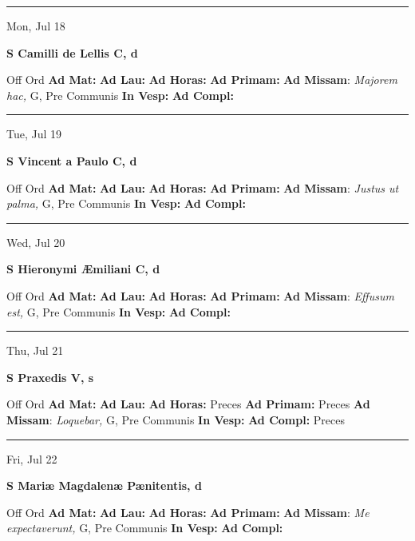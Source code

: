 \documentclass[letterpaper, 10pt]{article}
\begin{document}
\hrule
\begin{center}
Mon, Jul 18
\end{center}\textbf{ \large S Camilli de Lellis C, \textnormal{\normalsize d}}
\begin{justify}
Off Ord
\textbf{Ad Mat: }
\textbf{Ad Lau: }
\textbf{Ad Horas: }
\textbf{Ad Primam: }
\textbf{Ad Missam}: \textit{Majorem hac,} G, Pre Communis
\textbf{In Vesp: }
\textbf{Ad Compl: }\end{justify}



\hrule
\begin{center}
Tue, Jul 19
\end{center}\textbf{ \large S Vincent a Paulo C, \textnormal{\normalsize d}}
\begin{justify}
Off Ord
\textbf{Ad Mat: }
\textbf{Ad Lau: }
\textbf{Ad Horas: }
\textbf{Ad Primam: }
\textbf{Ad Missam}: \textit{Justus ut palma,} G, Pre Communis
\textbf{In Vesp: }
\textbf{Ad Compl: }\end{justify}



\hrule
\begin{center}
Wed, Jul 20
\end{center}\textbf{ \large S Hieronymi Æmiliani C, \textnormal{\normalsize d}}
\begin{justify}
Off Ord
\textbf{Ad Mat: }
\textbf{Ad Lau: }
\textbf{Ad Horas: }
\textbf{Ad Primam: }
\textbf{Ad Missam}: \textit{Effusum est,} G, Pre Communis
\textbf{In Vesp: }
\textbf{Ad Compl: }\end{justify}



\hrule
\begin{center}
Thu, Jul 21
\end{center}\textbf{ \large S Praxedis V, \textnormal{\normalsize s}}
\begin{justify}
Off Ord
\textbf{Ad Mat: }
\textbf{Ad Lau: }
\textbf{Ad Horas: }Preces
\textbf{Ad Primam: }Preces
\textbf{Ad Missam}: \textit{Loquebar,} G, Pre Communis
\textbf{In Vesp: }
\textbf{Ad Compl: }Preces\end{justify}



\hrule
\begin{center}
Fri, Jul 22
\end{center}\textbf{ \large S Mariæ Magdalenæ Pænitentis, \textnormal{\normalsize d}}
\begin{justify}
Off Ord
\textbf{Ad Mat: }
\textbf{Ad Lau: }
\textbf{Ad Horas: }
\textbf{Ad Primam: }
\textbf{Ad Missam}: \textit{Me expectaverunt,} G, Pre Communis
\textbf{In Vesp: }
\textbf{Ad Compl: }\end{justify}
\end{document}
